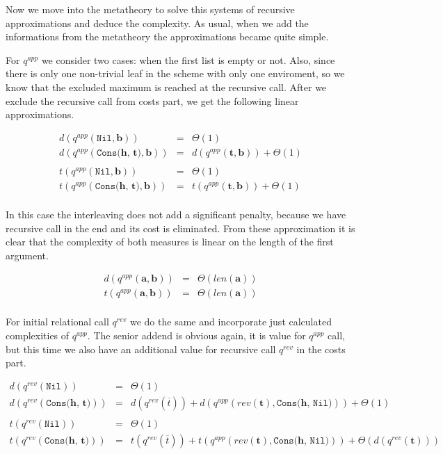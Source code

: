 Now we move into the metatheory to solve this systems of recursive approximations and deduce the complexity. As usual, when we add the informations from the metatheory the approximations became quite simple.

For $q^{app}$ we consider two cases: when the first list is empty or not. Also, since there is only one non-trivial leaf in the scheme with only one enviroment, so we know that the excluded maximum is reached at the recursive call. After we exclude the recursive call from costs part, we get the following linear approximations. 

\[
\begin{array}{lcl}
d(q^{app}(\texttt{Nil}, \mathbf{b})) & = & \Theta(1) \\
d(q^{app}(\texttt{Cons($\mathbf{h}$, $\mathbf{t}$)}, \mathbf{b})) & = & d(q^{app}(\mathbf{t}, \mathbf{b})) + \Theta(1) \\
\\
t(q^{app}(\texttt{Nil}, \mathbf{b})) & = & \Theta(1) \\
t(q^{app}(\texttt{Cons($\mathbf{h}$, $\mathbf{t}$)}, \mathbf{b})) & = & t(q^{app}(\mathbf{t}, \mathbf{b})) + \Theta(1) \\
\end{array}
 \]
 
In this case the interleaving does not add a significant penalty, because we have recursive call in the end and its cost is eliminated. From these approximation it is clear that the complexity of both measures is linear on the length of the first argument.

\[
\begin{array}{lcl}
d(q^{app}(\mathbf{a}, \mathbf{b})) & = & \Theta(len(\mathbf{a})) \\
t(q^{app}(\mathbf{a}, \mathbf{b})) & = & \Theta(len(\mathbf{a})) \\
\end{array}
 \]
 
For initial relational call $q^{rev}$ we do the same and incorporate just calculated complexities of $q^{app}$. The senior addend is obvious again, it is value for $q^{app}$ call, but this time we also have an additional value for recursive call $q^{rev}$ in the costs part.

\[
\begin{array}{lcl}
d(q^{rev}(\texttt{Nil})) & = & \Theta(1) \\
d(q^{rev}(\texttt{Cons($\mathbf{h}$, $\mathbf{t}$)})) & = & d(q^{rev}(\overline{t})) + d(q^{app}(rev(\mathbf{t}), \texttt{Cons($\mathbf{h}$, Nil)})) + \Theta(1) \\
\\
t(q^{rev}(\texttt{Nil})) & = & \Theta(1) \\
t(q^{rev}(\texttt{Cons($\mathbf{h}$, $\mathbf{t}$)})) & = & t(q^{rev}(\overline{t})) + t(q^{app}(rev(\mathbf{t}), \texttt{Cons($\mathbf{h}$, Nil)})) + \Theta(d(q^{rev}(\mathbf{t}))) \\
\end{array}
 \]
 
